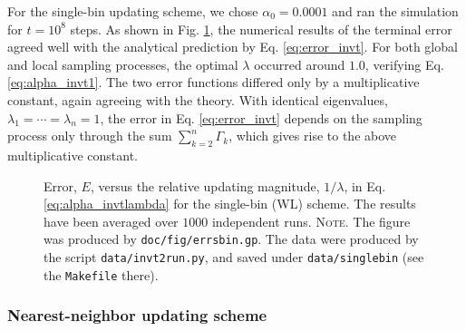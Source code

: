 \documentclass[reprint, floatfix]{revtex4-1}
\newcommand{\note}[1]{{\color{DarkGreen}\footnotesize \textsc{Note.} #1}}
\begin{document}
For the single-bin updating scheme,
we chose $\alpha_0 = 0.0001$
and ran the simulation for $t = 10^8$ steps.
%
As shown in Fig. \ref{fig:errsbin},
the numerical results of the terminal error agreed well with
the analytical prediction by Eq. \eqref{eq:error_invt}.
%
For both global and local sampling processes,
the optimal $\lambda$ occurred around $1.0$,
verifying Eq. \eqref{eq:alpha_invt1}.
%
%
The two error functions
differed only by a multiplicative constant,
again agreeing with the theory.
%
With identical eigenvalues,
$\lambda_1 = \cdots = \lambda_n = 1$,
the error in Eq. \eqref{eq:error_invt}
depends on the sampling process only through
the sum $\sum_{ k = 2 }^n \Gamma_k$,
which gives rise to the above multiplicative constant.


\begin{figure}[h]
\begin{center}
  \caption{
    \label{fig:errsbin}
    Error, $E$, versus the
    relative updating magnitude,
    $1/\lambda$,
    in Eq. \eqref{eq:alpha_invtlambda}
    for the single-bin (WL) scheme.
    The results have been averaged over $1000$ independent runs.
    \note{The figure was produced by \texttt{doc/fig/errsbin.gp}.
      The data were produced by the script \texttt{data/invt2run.py},
      and saved under \texttt{data/singlebin}
      (see the \texttt{Makefile} there).
    }%
  }
\end{center}
\end{figure}



\subsubsection{Nearest-neighbor updating scheme}
\end{document}

